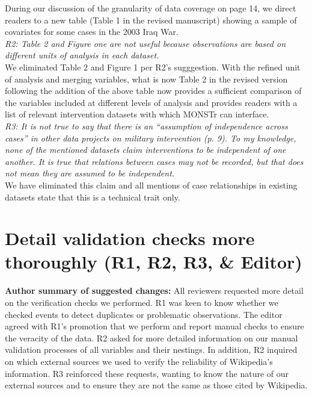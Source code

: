 \documentclass[fleqn,12pt]{article}
\begin{document}
During our discussion of the granularity of data coverage on page 14, we direct readers to a new table (Table 1 in the revised manuscript) showing a sample of covariates for some cases in the 2003 Iraq War. \\

\noindent
\textit{R2: Table 2 and Figure one are not useful because observations are based on different units of analysis in each dataset.} \\

We eliminated Table 2 and Figure 1 per R2's sugggestion. With the refined unit of analysis and merging variables, what is now Table 2 in the revised version following the addition of the above table now provides a sufficient comparison of the variables included at different levels of analysis and provides readers with a list of relevant intervention datasets with which MONSTr can interface. \\

\noindent
\textit{R3: It is not true to say that there is an “assumption of independence across cases” in other data projects on military intervention (p. 9). To my knowledge, none of the mentioned datasets claim interventions to be independent of one another. It is true that relations between cases may not be recorded, but that does not mean they are assumed to be independent.} \\

We have eliminated this claim and all mentions of case relationships in existing datasets state that this is a technical trait only.

\section{Detail validation checks more thoroughly (R1, R2, R3, \& Editor)}
\noindent \textbf{Author summary of suggested changes:} All reviewers requested more detail on the verification checks we performed. R1 was keen to know whether we checked events to detect duplicates or problematic observations. The editor agreed with R1's promotion that we perform and report manual checks to ensure the veracity of the data. R2 asked for more detailed information on our manual validation processes of all variables and their nestings. In addition, R2 inquired on which external sources we used to verify the reliability of Wikipedia's information. R3 reinforced these requests, wanting to know the nature of our external sources and to ensure they are not the same as those cited by Wikipedia. \\
\end{document}
